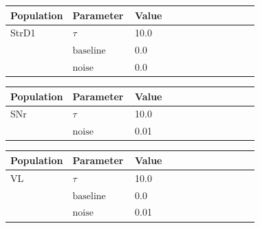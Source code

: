 \documentclass{article}
\begin{document}
\vspace{2ex}

\noindent
\begin{tabularx}{\linewidth}{|p{0.25\linewidth}|p{0.25\linewidth}|X|}\hline
\textbf{Population} & \textbf{Parameter} & \textbf{Value}   \\ \hline

    StrD1             & $\tau$        & 10.0  \\ \hline

                 & ${\text{baseline}}$        & 0.0  \\ \hline

                 & ${\text{noise}}$        & 0.0  \\ \hline

\end{tabularx}

\vspace{2ex}

\noindent
\begin{tabularx}{\linewidth}{|p{0.25\linewidth}|p{0.25\linewidth}|X|}\hline
\textbf{Population} & \textbf{Parameter} & \textbf{Value}   \\ \hline

    SNr             & $\tau$        & 10.0  \\ \hline

                 & ${\text{noise}}$        & 0.01  \\ \hline

\end{tabularx}

\vspace{2ex}

\noindent
\begin{tabularx}{\linewidth}{|p{0.25\linewidth}|p{0.25\linewidth}|X|}\hline
\textbf{Population} & \textbf{Parameter} & \textbf{Value}   \\ \hline

    VL             & $\tau$        & 10.0  \\ \hline

                 & ${\text{baseline}}$        & 0.0  \\ \hline

                 & ${\text{noise}}$        & 0.01  \\ \hline

\end{tabularx}

\vspace{2ex}
\end{document}
